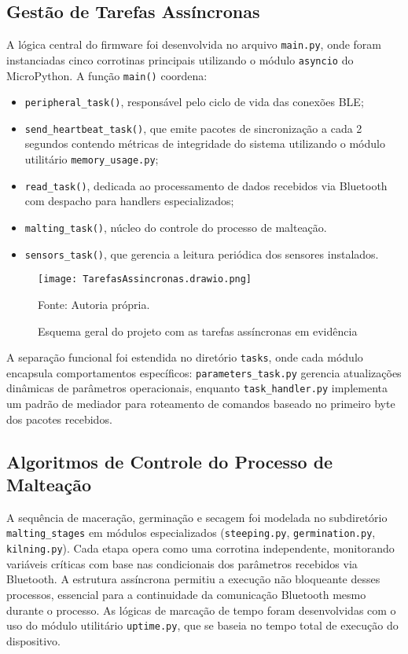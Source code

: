 \subsection{Gestão de Tarefas Assíncronas}
A lógica central do firmware foi desenvolvida no arquivo \texttt{main.py}, onde foram instanciadas cinco corrotinas principais utilizando o módulo \texttt{asyncio} do MicroPython. A função \texttt{main()} coordena:

\begin{itemize}

    \item \texttt{peripheral\_task()}, responsável pelo ciclo de vida das conexões BLE;
    \item \texttt{send\_heartbeat\_task()}, que emite pacotes de sincronização a cada 2 segundos contendo métricas de integridade do sistema utilizando o módulo utilitário \texttt{memory\_usage.py};
    \item \texttt{read\_task()}, dedicada ao processamento de dados recebidos via Bluetooth com despacho para handlers especializados;
    \item \texttt{malting\_task()}, núcleo do controle do processo de malteação.
    \item \texttt{sensors\_task()}, que gerencia a leitura periódica dos sensores instalados.


\end{itemize}

\begin{figure}[ht]
    \centering
    \caption{Esquema geral do projeto com as tarefas assíncronas em evidência}
    \label{fig:TarefasAssincronasFluxograma}
    \texttt{[image: TarefasAssincronas.drawio.png]}

    {\centering\footnotesize Fonte: Autoria própria.\par}
\end{figure}

A separação funcional foi estendida no diretório \texttt{tasks}, onde cada módulo encapsula comportamentos específicos: \texttt{parameters\_task.py} gerencia atualizações dinâmicas de parâmetros operacionais, enquanto \texttt{task\_handler.py} implementa um padrão de mediador para roteamento de comandos baseado no primeiro byte dos pacotes recebidos.

\subsection{Algoritmos de Controle do Processo de Malteação}
A sequência de maceração, germinação e secagem foi modelada no subdiretório \texttt{malting\_stages} em módulos especializados (\texttt{steeping.py}, \texttt{germination.py}, \texttt{kilning.py}). Cada etapa opera como uma corrotina independente, monitorando variáveis críticas com base nas condicionais dos parâmetros recebidos via Bluetooth. A estrutura assíncrona permitiu a execução não bloqueante desses processos, essencial para a continuidade da comunicação Bluetooth mesmo durante o processo. As lógicas de marcação de tempo foram desenvolvidas com o uso do módulo utilitário \texttt{uptime.py}, que se baseia no tempo total de execução do dispositivo.

